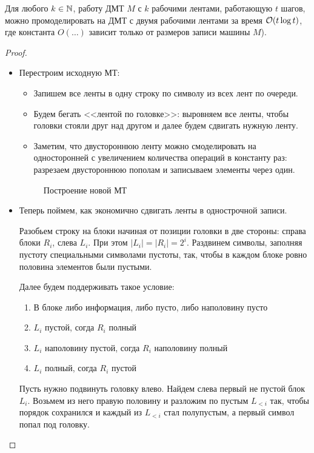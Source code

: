 \begin{thm}\label{th:two_bands}
	Для любого $ k \in \mathbb{N}$, работу ДМТ  $ M$ с $ k$ рабочими лентами, работающую $ t$ шагов, можно  промоделировать на  ДМТ с двумя рабочими лентами за время  $ \mathcal{O}(t \log t)$,
	где константа $ O(\ldots ) $ зависит только от размеров записи машины $ M$).
\end{thm}
\begin{proof}
	\begin{itemize}
		\item
			Перестроим исходную МТ:
			\begin{itemize}
				\item Запишем все ленты в одну строку  по символу из всех лент по очереди.
				\item  Будем бегать <<лентой по головке>>: выровняем все ленты, чтобы головки стояли друг над  другом и далее будем сдвигать нужную ленту.
				\item Заметим, что двустороннюю ленту можно смоделировать на односторонней с увеличением количества операций в константу раз: разрезаем двустороннюю пополам и записываем элементы через один.
			\end{itemize}
			\begin{figure}[ht]
				\centering
				\caption{Построение новой МТ}
				\label{fig:two-bands}
			\end{figure}
		\item
			Теперь поймем, как экономично сдвигать ленты в однострочной записи.

			Разобьем строку на блоки начиная от позиции головки в две стороны: справа блоки $ R_i$, слева $ L_i$. При этом $ \lvert L_i \rvert = \lvert R_i \rvert  = 2^{i}$. Раздвинем символы, заполняя пустоту специальными символами пустоты, так, чтобы в каждом блоке ровно половина элементов были пустыми.

			Далее будем поддерживать такое условие:
			\begin{enumerate}[noitemsep]
				\item В блоке либо информация, либо пусто, либо наполовину пусто
				\item $ L_i$ пустой, согда  $ R_i$ полный
				\item  $ L_i$ наполовину пустой, согда $ R_i$ наполовину полный
				\item $ L_i$ полный, согда $ R_i$ пустой
			\end{enumerate}

			Пусть нужно подвинуть головку влево. Найдем слева первый не пустой блок $ L_i$. Возьмем из него правую половину и разложим по пустым $ L_{<i}$ так, чтобы порядок сохранился и каждый из $ L_{<i}$ стал полупустым, а первый символ попал под головку.


\end{itemize}
\end{proof}
